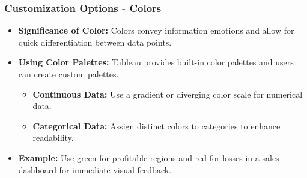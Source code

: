 \documentclass[aspectratio=169]{beamer}
\begin{document}
\begin{frame}[fragile]
    \frametitle{Customization Options - Colors}
    \begin{itemize}
        \item \textbf{Significance of Color:} 
            Colors convey information emotions and allow for quick differentiation between data points.
        
        \item \textbf{Using Color Palettes:} 
            Tableau provides built-in color palettes and users can create custom palettes. 
            \begin{itemize}
                \item \textbf{Continuous Data:} Use a gradient or diverging color scale for numerical data.
                \item \textbf{Categorical Data:} Assign distinct colors to categories to enhance readability.
            \end{itemize}
        
        \item \textbf{Example:} 
            Use green for profitable regions and red for losses in a sales dashboard for immediate visual feedback.
    \end{itemize}
\end{frame}
\end{document}
